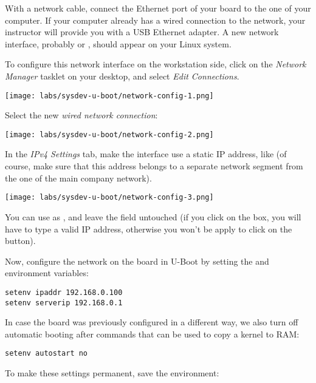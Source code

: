 With a network cable, connect the Ethernet port of your board to the
one of your computer. If your computer already has a wired connection
to the network, your instructor will provide you with a USB Ethernet
adapter. A new network interface, probably  or ,
should appear on your Linux system.

To configure this network interface on the workstation side, click on
the {\em Network Manager} tasklet on your desktop, and select {\em
  Edit Connections}.

\begin{center}
\texttt{[image: labs/sysdev-u-boot/network-config-1.png]}
\end{center}

Select the new {\em wired network connection}:

\begin{center}
\texttt{[image: labs/sysdev-u-boot/network-config-2.png]}
\end{center}

In the {\em IPv4 Settings} tab, make the interface use a static IP
address, like  (of course, make sure that this
address belongs to a separate network segment from the one of the main
company network).

\begin{center}
\texttt{[image: labs/sysdev-u-boot/network-config-3.png]}
\end{center}

You can use  as , and leave the
 field untouched (if you click on the  box, you
will have to type a valid IP address, otherwise you won't be apply to
click on the  button).

Now, configure the network on the board in U-Boot by setting the 
and  environment variables:

\begin{verbatim}
setenv ipaddr 192.168.0.100
setenv serverip 192.168.0.1
\end{verbatim}

In case the board was previously configured in a different way, we
also turn off automatic booting after commands that can be used to
copy a kernel to RAM:

\begin{verbatim}
setenv autostart no
\end{verbatim}

To make these settings permanent, save the environment:

